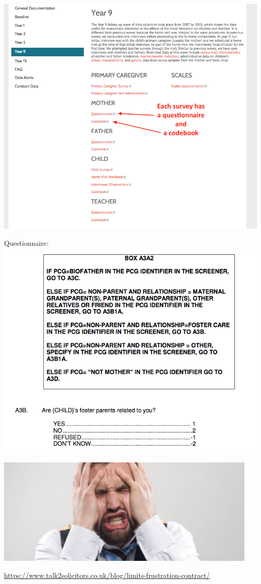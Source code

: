 \documentclass[aspectratio=169]{beamer}
\begin{document}
\begin{frame}

\centering\includegraphics[width = .8\textwidth]{figures/Doc3}

\end{frame}
\begin{frame}

Questionnaire:\\
\centering\includegraphics[width = .8\textwidth]{figures/Doc4}

\end{frame}
\begin{frame}

\begin{center}
\includegraphics[width=0.95\textwidth]{figures/frustrating}
\end{center}

\vfill
\tiny{\url{https://www.talk2solicitors.co.uk/blog/limits-frustration-contract/}}

\end{frame}
\end{document}
